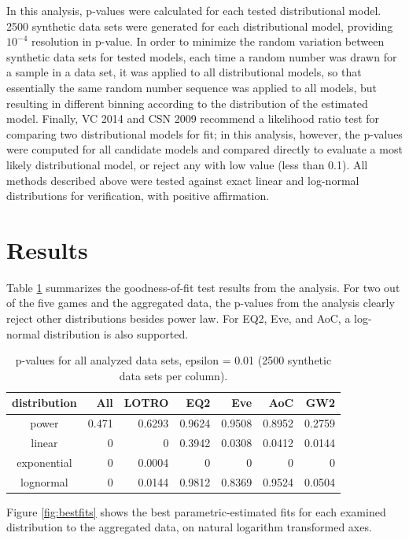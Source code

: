 \documentclass[pdftex,12pt]{llncs}
\begin{document}
In this analysis, p-values were calculated for each tested distributional model.
2500 synthetic data sets were generated for each distributional model, providing $10^{-4}$ resolution in p-value.
In order to minimize the random variation between synthetic data sets for tested models, each time a random number was drawn for a sample in a data set, it was applied to all distributional models, so that essentially the same random number sequence was applied to all models, but resulting in different binning according to the distribution of the estimated model.
Finally, VC 2014 and CSN 2009 recommend a likelihood ratio test for comparing two distributional models for fit; in this analysis, however, the p-values were computed for all candidate models and compared directly to evaluate a most likely distributional model, or reject any with low value (less than 0.1).
All methods described above were tested against exact linear and log-normal distributions for verification, with positive affirmation.

\section{Results}
Table \ref{tab:pvalues} summarizes the goodness-of-fit test results from the analysis.
For two out of the five games and the aggregated data, the p-values from the analysis clearly reject other distributions besides power law.
For EQ2, Eve, and AoC, a log-normal distribution is also supported.

\begin{table}
	\centering
	\caption{p-values for all analyzed data sets, epsilon = 0.01 (2500 synthetic data sets per column).}
	\begin{tabular}{|c r r r r r r|}
		\hline
		distribution & 	All	& LOTRO & EQ2 & Eve & AoC & GW2 \\
		\hline
		power & 0.471 & 0.6293 & 0.9624 & 0.9508 & 0.8952 & 0.2759 \\
		linear & 0 & 0 & 0.3942 & 0.0308 & 0.0412 & 0.0144 \\
		exponential & 0 & 0.0004 & 0 & 0 & 0 & 0 \\
		lognormal & 0 & 0.0144 & 0.9812 & 0.8369 & 0.9524 & 0.0504 \\
		\hline
	\end{tabular}	
	\label{tab:pvalues}
\end{table}
Figure \ref{fig:bestfits} shows the best parametric-estimated fits for each examined distribution to the aggregated data, on natural logarithm transformed axes.
\end{document}
